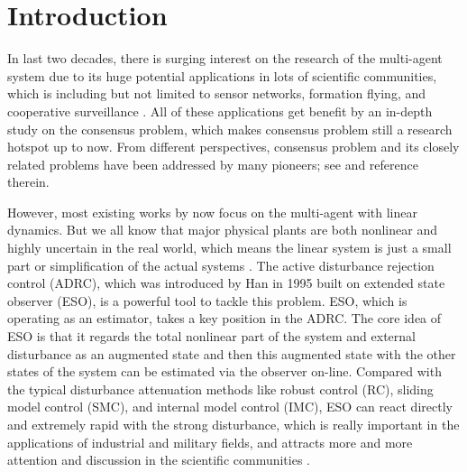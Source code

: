 \documentclass[english]{cccconf}
\begin{document}
\section{Introduction}

In last two decades, there is surging interest on the research of the multi-agent system due to its huge potential applications in lots of scientific communities, which is including but not limited to sensor networks, formation flying, and cooperative surveillance \cite{Li2010Consensus,Olfati2007Consensus,Ren2007Information}. All of these applications get benefit by an in-depth study on the consensus problem, which makes consensus problem still a research hotspot up to now. From different perspectives, consensus problem and its closely related problems have been addressed by many pioneers; see \cite{Olfati2004Consensus,Ding2016Distributed,Li2016Distributed,Ren2005Consensus,Li2013Consensus} and reference therein.  

However, most existing works by now focus on the multi-agent with linear dynamics. But we all know that major physical plants are both nonlinear and highly uncertain in the real world, which means the linear system is just a small part or simplification of the actual systems \cite{Zheng2008On}. The active disturbance rejection control (ADRC), which was introduced by Han  in 1995 built on extended state observer (ESO)\cite{Gao2015Active}, is a powerful tool to tackle this problem\cite{Han2009From}.
ESO, which is operating as an estimator, takes a key position in the ADRC. The core idea of ESO is that it regards the total nonlinear part of the system and external disturbance as an augmented state and then this augmented state with the other states of the system can be estimated via the observer on-line. Compared with the typical disturbance attenuation methods like robust control (RC), sliding model control (SMC), and internal model control (IMC), ESO can react directly and extremely rapid with the strong disturbance\cite{Li2014Disturbance}, which is really important in the applications of industrial and military fields, and attracts more and more attention and discussion in the scientific communities \cite{Guo2012,Sun2017Sampled,Wang2016Consensus}.
\end{document}
